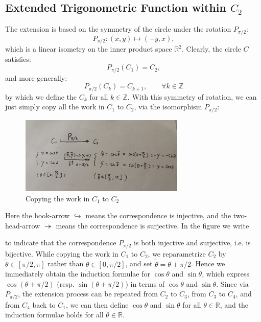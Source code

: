\documentclass{article}
\begin{document}
\subsection{Extended Trigonometric Function within $C_2$}
The extension is based on the symmetry of the circle under the rotation $P_{\pi/2}$:
$$ P_{\pi/2}: (x, y)\mapsto (-y, x), $$ 
which is a linear isometry on the inner product space $\mathbb{R}^2$. Clearly, the circle $C$ satisfies:
$$ P_{\pi/2} (C_1) = C_2, $$
and more generally:
$$ P_{\pi/2} (C_k) = C_{k+1}, \qquad \forall k\in\mathbb{Z} $$ 
by which we define the $C_k$ for all $k\in\mathbb{Z}$. With this symmetry of rotation, we can just simply copy all the work in $C_1$ to $C_2$, via the isomorphism $P_{\pi/2}$:


\begin{figure}[H]
    \centering
    \includegraphics[width=0.7\textwidth]{figs_P1/1.jpg}
    \caption{Copying the work in $C_1$ to $C_2$}
    \label{fig:c1_to_c2}
\end{figure}

Here the hook-arrow $\hookrightarrow$ means the correspondence is injective, and the two-head-arrow $\twoheadrightarrow$ means the correspondence is surjective. In the figure we write 
to indicate that the correspondence $P_{\pi/2}$ is both injective and surjective, i.e. is bijective. While copying the work in $C_1$ to $C_2$, we reparametrize $C_2$ by $\tilde{\theta} \in [\pi/2, \pi]$ rather than $\theta \in [0, \pi/2]$, and set $\tilde{\theta} = \theta + \pi/2$. Hence we immediately obtain the induction formulae for $\cos \theta$ and $\sin \theta$, which express $\cos (\theta + \pi/2)$ (resp. $\sin (\theta + \pi/2)$) in terms of $\cos \theta$ and $\sin \theta$. Since via $P_{\pi/2}$, the extension process can be repeated from $C_2$ to $C_3$, from $C_3$ to $C_4$, and from $C_4$ back to $C_1$, we can then define $\cos \theta$ and $\sin \theta$ for all $\theta\in \mathbb{R}$, and the induction formulae holds for all $\theta\in \mathbb{R}$.
\end{document}

